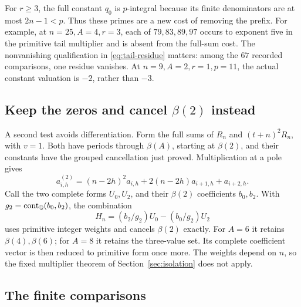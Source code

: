 For $r\ge3$, the full constant $q_0$ is $p$-integral because its
finite denominators are at most $2n-1<p$. Thus these primes are a
new cost of removing the prefix. For example, at $n=25,A=4,r=3$,
each of $79,83,89,97$ occurs to exponent five in the primitive tail
multiplier and is absent from the full-sum cost. The nonvanishing
qualification in \eqref{eq:tail-residue} matters: among the $67$
recorded comparisons, one residue vanishes. At $n=9,A=2,r=1,p=11$,
the actual constant valuation is $-2$, rather than $-3$.

\subsection{Keep the zeros and cancel \texorpdfstring{$\beta(2)$}{beta(2)} instead}

A second test avoids differentiation. Form the full sums of $R_n$
and $(t+n)^2R_n$, with $v=1$. Both have periods through $\beta(A)$,
starting at $\beta(2)$, and their constants have the grouped
cancellation just proved. Multiplication at a pole gives
\[
 a^{(2)}_{i,h}=(n-2h)^2a_{i,h}
          +2(n-2h)a_{i+1,h}+a_{i+2,h}.
\]
Call the two complete forms $U_0,U_2$, and their $\beta(2)$
coefficients $b_0,b_2$. With $g_2=\operatorname{cont}_{\mathbb Q}(b_0,b_2)$, the combination
\[
 H_n=(b_2/g_2)U_0-(b_0/g_2)U_2
\]
uses primitive integer weights and cancels $\beta(2)$ exactly.
For $A=6$ it retains $\beta(4),\beta(6)$; for $A=8$ it retains the
three-value set. Its complete coefficient vector is then reduced to
primitive form once more. The weights depend on $n$, so the fixed
multiplier theorem of Section~\ref{sec:isolation} does not apply.

\subsection{The finite comparisons}

